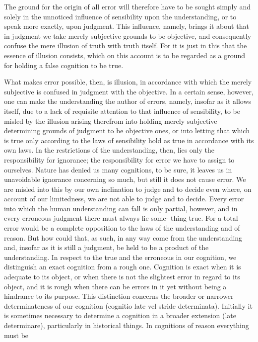 The ground for the origin of all error will therefore have to be sought
simply and solely in the unnoticed influence of sensibility upon
the understanding, or to speak more exactly, upon judgment.
This influence, namely, brings it about that in judgment
we take merely subjective grounds to be objective, and
consequently confuse the mere illusion of truth with truth itself.
For it is just in this that the essence of illusion consists,
which on this account is to be regarded as a ground
for holding a false cognition to be true.

What makes error possible, then, is illusion,
in accordance with which the merely subjective is
confused in judgment with the objective.
In a certain sense, however, one can make the understanding the author
of errors, namely,  insofar as it allows itself,
due to a lack of requisite attention to that influence of sensibility,
to be misled by the illusion arising therefrom into holding
merely subjective determining grounds of judgment to be objective ones,
or into letting that which is true only according to the laws of sensibility hold
as true in accordance with its own laws.
In the restrictions of the understanding, then, lies only the responsibility for ignorance;
the responsibility for error we have to assign to ourselves.
Nature has denied us many cognitions, to be sure, it leaves us in
unavoidable ignorance concerning so much, but still it does not cause
error.
We are misled into this by our own inclination to judge and to
decide even where, on account of our limitedness, we are not able to
judge and to decide.
Every error into which the human understanding can fall is only partial,
however, and in every erroneous judgment there must always lie some-
thing true. For a total error would be a complete opposition to the laws of
the understanding and of reason. But how could that, as such, in any way
come from the understanding and, insofar as it is still a judgment, be held
to be a product of the understanding.
In respect to the true and the erroneous in our cognition,
we distinguish an exact cognition from a rough one.
Cognition is exact when it is adequate to its object, or
when there is not the slightest error in regard to its object,
and it is rough when there can be errors in it yet without being a hindrance to its purpose.
This distinction concerns the broader or narrower determinateness of our
cognition (cognitio late vel stride determinata).
Initially it is sometimes necessary to determine a cognition in a broader extension (late determinare),
particularly in historical things.
In cognitions of reason everything must be
